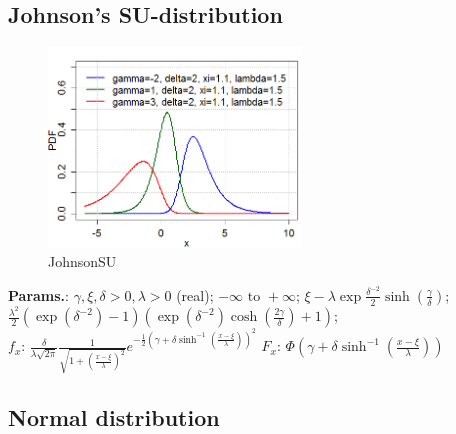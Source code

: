     
        
\subsection{Johnson's SU-distribution}


    \begin{figure}[H]
        \centering
        \includegraphics[width=0.6\textwidth]{images/JohnsonSU.png}
        \caption{JohnsonSU}
    \end{figure}




    {\color{darkblue} \textbf{Params.}:} {$ \gamma, \xi, \delta > 0, \lambda > 0 $ (real)}; {$ -\infty  \text{ to } +\infty $}; {$\xi - \lambda \exp \frac{\delta^{-2}}{2} \sinh\left(\frac{\gamma}{\delta}\right)$}; {$\frac{\lambda^2}{2} (\exp(\delta^{-2})-1) \left( \exp(\delta^{-2}) \cosh \left(\frac{2\gamma}{\delta} \right) +1 \right)$};\hspace{0.5cm}\\{\color{darkblue} \textbf{$f_x$}:} {$\frac{\delta}{\lambda\sqrt{2\pi}} \frac{1}{\sqrt{1 + \left(\frac{x-\xi}{\lambda}\right)^2}} e^{-\frac{1}{2}\left(\gamma+\delta \sinh^{-1} \left(\frac{x-\xi}{\lambda}\right)\right)^2}$}{\color{darkblue} \textbf{$F_x$}:} {$\Phi \left(\gamma + \delta \sinh^{-1} \left( \frac{x-\xi}{\lambda} \right) \right)$}



    
        
\subsection{Normal distribution}






